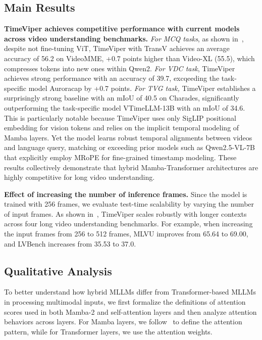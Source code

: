 \documentclass[10pt,twocolumn,letterpaper]{article}
\begin{document}
\subsection{Main Results}
\label{subsec: main_results}


\noindent\textbf{TimeViper achieves competitive performance with current models across video understanding benchmarks.}
\textit{For MCQ tasks}, 
as shown in~, despite not fine-tuning ViT, TimeViper with TransV achieves an average accuracy of 56.2 on VideoMME, +0.7 points higher than Video-XL (55.5), which compresses tokens into new ones within Qwen2. 
\textit{For VDC task}, TimeViper achieves strong performance with an accuracy of 39.7, excqeeding the task-specific model Auroracap by +0.7 points.
\textit{For TVG task,} 
TimeViper establishes a surprisingly strong baseline with an mIoU of 40.5 on Charades, significantly outperforming the task-specific model VTimeLLM-13B with an mIoU of 34.6. 
This is particularly notable because TimeViper uses only SigLIP positional embedding for vision tokens and relies on the implicit temporal modeling of Mamba layers. 
Yet the model learns robust temporal alignments between videos and language query, matching or exceeding prior models such as Qwen2.5-VL-7B that explicitly employ MRoPE for fine-grained timestamp modeling.
These results collectively demonstrate that hybrid Mamba-Transformer architectures are highly competitive for long video understanding.




\noindent\textbf{Effect of increasing the number of inference frames.}
Since the model is trained with 256 frames, we evaluate test-time scalability by varying the number of input frames. 
As shown in~, TimeViper scales robustly with longer contexts across four long video understanding benchmarks.
For example, when increasing the input frames from 256 to 512 frames, MLVU improves from 65.64 to 69.00, and LVBench increases from 35.53 to 37.0.


\subsection{Qualitative Analysis}
\label{subsec: analyses}
To better understand how hybrid MLLMs differ from Transformer-based MLLMs in processing multimodal inputs, we first formalize the definitions of attention scores used in both Mamba-2 and self-attention layers and then analyze attention behaviors across layers. 
For Mamba layers, we follow~\cite{ameen2025mambavis} to define the attention pattern, while for Transformer layers, we use the attention weights. 
\end{document}
